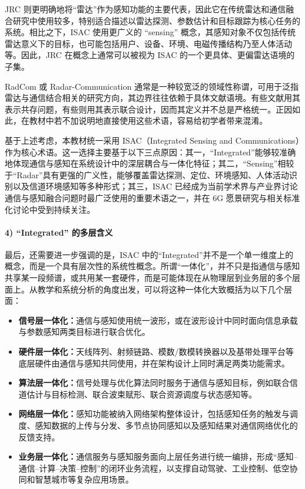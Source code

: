 JRC 则更明确地将“雷达”作为感知功能的主要代表，因此它在传统雷达和通信融合研究中使用较多，特别适合描述以雷达探测、参数估计和目标跟踪为核心任务的系统\cite{Liu2020JointRadarComm,Hassanien2015dual}。相比之下，ISAC 使用更广义的 “sensing” 概念，其感知对象不仅包括传统雷达意义下的目标，也可能包括用户、设备、环境、电磁传播结构乃至人体活动等。因此，JRC 在概念上通常可以被视为 ISAC 的一个更具体、更偏雷达语境的子集。

RadCom 或 Radar-Communication 通常是一种较宽泛的领域性称谓，可用于泛指雷达与通信结合相关的研究方向，其边界往往依赖于具体文献语境。有些文献用其表示共存问题，有些则用其表示联合设计，因而其定义并不总是严格统一。正因如此，在教材中若不加说明地直接使用这些术语，容易给初学者带来混淆。

基于上述考虑，本教材统一采用 ISAC（Integrated Sensing and Communications）作为核心术语。这一选择主要基于以下三点原因：其一，“Integrated”能够较准确地体现通信与感知在系统设计中的深层耦合与一体化特征；其二，“Sensing”相较于“Radar”具有更强的广义性，能够覆盖雷达探测、定位、环境感知、人体活动识别以及信道环境感知等多种形式；其三，ISAC 已经成为当前学术界与产业界讨论通信与感知融合问题时最广泛使用的重要术语之一，并在 6G 愿景研究与相关标准化讨论中受到持续关注\cite{Liu2022ISAC,Gonzalez2024integrated,De2021convergent}。

\paragraph{4) “Integrated” 的多层含义}

最后，还需要进一步强调的是，ISAC 中的“Integrated”并不是一个单一维度上的概念，而是一个具有层次性的系统性概念。所谓“一体化”，并不只是指通信与感知共享某一段频谱，或共用某一套硬件，而是可能体现在从物理层到业务层的多个层面上\cite{Liu2022ISAC,Zhang2021ISAC6G,Liu2020JointRadarComm}。从教学和系统分析的角度出发，可以将这种一体化大致概括为以下几个层面：

\begin{itemize}
    \item \textbf{信号层一体化：}通信与感知使用统一波形，或在波形设计中同时面向信息承载与参数感知两类目标进行联合优化。

    \item \textbf{硬件层一体化：}天线阵列、射频链路、模数/数模转换器以及基带处理平台等底层硬件由通信与感知共同使用，并在架构设计上同时满足两类功能需求。

    \item \textbf{算法层一体化：}信号处理与优化算法同时服务于通信与感知目标，例如联合信道估计与目标检测、联合波束赋形、联合资源调度与状态感知等。

    \item \textbf{网络层一体化：}感知功能被纳入网络架构整体设计，包括感知任务的触发与调度、感知数据的上传与分发、多节点协同感知以及感知结果对通信网络优化的反馈支持。

    \item \textbf{业务层一体化：}通信服务与感知服务面向上层任务进行统一编排，形成“感知--通信--计算--决策--控制”的闭环业务流程，以支撑自动驾驶、工业控制、低空协同和智慧城市等复杂应用场景。
\end{itemize}

